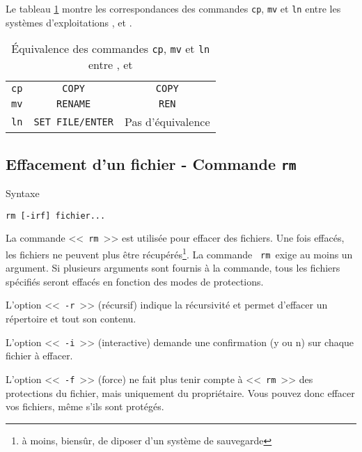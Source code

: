 Le tableau \ref{tab-cmds-equiv-mvcpln} montre les correspondances des commandes
{\tt cp}, {\tt mv} et {\tt ln} entre les syst{\`e}mes d'exploitations {\Unix},
{\OpenVMS} et {\DOS}.

\begin{table}[hbtp]
\centering
\begin{tabular}{|c|c|c|}
	\hline
		{\Unix}		&	{\OpenVMS}	&	{\DOS}					\\
	\hline \hline
		{\tt cp}		&	{\tt COPY}		&	{\tt COPY}				\\
		{\tt mv}		&	{\tt RENAME}	&	{\tt REN}	\\
		{\tt ln}		&	{\tt SET FILE/ENTER} 	&	Pas d'{\'e}quivalence	\\
	\hline
\end{tabular}
\caption{\label{tab-cmds-equiv-mvcpln}\'{E}quivalence des commandes {\tt cp},
{\tt mv} et {\tt ln} entre {\Unix},{\OpenVMS} et {\DOS}}
\end{table}

\subsection{\texorpdfstring{Effacement d'un fichier - Commande {\tt rm}}{Effacement d'un fichier - Commande rm}}

\begin{definition}{Syntaxe}
\begin{verbatim}
rm [-irf] fichier...
\end{verbatim}
\end{definition}

La commande <<~{\tt rm}~>> est utilis{\'e}e pour effacer des fichiers. Une
fois effac{\'e}s, les fichiers ne peuvent plus {\^e}tre r{\'e}cup{\'e}r{\'e}s\footnote{{\`a}
moins, biens{\^u}r, de diposer d'un syst{\`e}me de sauvegarde}. La commande {\tt
rm }exige au moins un argument. Si plusieurs arguments sont fournis {\`a} la
commande, tous les fichiers sp{\'e}cifi{\'e}s seront effac{\'e}s en fonction des
modes de protections.

L'option <<~{\tt -r}~>> (r{\'e}cursif) indique la r{\'e}cursivit{\'e} et permet d'effacer un r{\'e}pertoire et tout son contenu.

L'option <<~{\tt -i}~>> (interactive) demande une confirmation (y ou n) sur chaque fichier {\`a} effacer.

L'option <<~{\tt -f}~>> (force) ne fait plus tenir compte {\`a} <<~{\tt rm}~>> des protections du fichier, mais uniquement du
propri{\'e}taire. Vous pouvez donc effacer vos fichiers, m{\^e}me s'ils sont prot{\'e}g{\'e}s.

